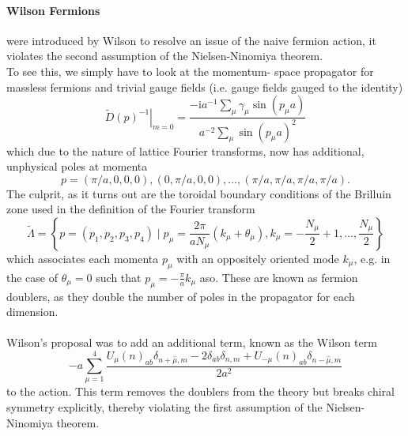 \documentclass[a4paper,10pt]{article}
\begin{document}
\paragraph{Wilson Fermions} were introduced by Wilson to resolve an issue of the naive fermion action, it violates the second assumption of the Nielsen-Ninomiya theorem.\\To see this, we simply have to look at the momentum- space propagator for massless fermions and trivial gauge fields (i.e. gauge fields gauged to the identity)
\begin{equation}
\left.\widetilde{D}(p)^{-1}\right|_{m=0}=\frac{-\mathrm{i} a^{-1} \sum_{\mu} \gamma_{\mu} \sin \left(p_{\mu} a\right)}{a^{-2} \sum_{\mu} \sin \left(p_{\mu} a\right)^{2}}
\end{equation}
which due to the nature of lattice Fourier transforms, now has additional, unphysical poles at momenta 
\begin{equation}
p=(\pi / a, 0,0,0),(0, \pi / a, 0,0), \ldots,(\pi / a, \pi / a, \pi / a, \pi / a).
\end{equation}
The culprit, as it turns out are the toroidal boundary conditions of the Brilluin zone used in the definition of the Fourier transform
\begin{equation}
\widetilde{\Lambda}=\left\{p=\left(p_{1}, p_{2}, p_{3}, p_{4}\right) \mid p_{\mu}=\frac{2 \pi}{a N_{\mu}}\left(k_{\mu}+\theta_{\mu}\right), k_{\mu}=-\frac{N_{\mu}}{2}+1, \ldots, \frac{N_{\mu}}{2}\right\}
\end{equation}
which associates each momenta $p_\mu$ with an oppositely oriented mode $k_\mu$, e.g. in the case of $\theta_\mu = 0$ such that $p_\mu=-\frac{\pi}{a}k_\mu$ aso. These are known as fermion doublers, as they double the number of poles in the propagator for each dimension.\\\\ Wilson's proposal was to add an additional term, known as the Wilson term
\begin{equation}
-a \sum_{\mu=1}^{4} \frac{U_{\mu}(n)_{a b} \delta_{n+\hat{\mu}, m}-2 \delta_{a b} \delta_{n, m}+U_{-\mu}(n)_{a b} \delta_{n-\hat{\mu}, m}}{2 a^{2}}
\end{equation}
to the action. This term removes the doublers from the theory but breaks chiral symmetry explicitly, thereby violating the first assumption of the Nielsen-Ninomiya theorem.
\end{document}
